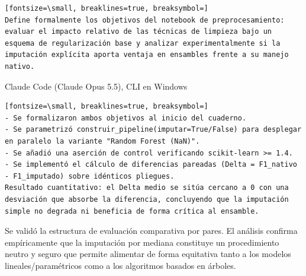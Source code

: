 \documentclass[12pt,a4paper,oneside]{book}
\begin{document}
\begin{iaprompt}
\begin{Verbatim}[fontsize=\small, breaklines=true, breaksymbol=]
Define formalmente los objetivos del notebook de preprocesamiento: evaluar el impacto relativo de las técnicas de limpieza bajo un esquema de regularización base y analizar experimentalmente si la imputación explícita aporta ventaja en ensambles frente a su manejo nativo.
\end{Verbatim}
\end{iaprompt}
\begin{iaresp}{Claude Code (Claude Opus 5.5), CLI en Windows}
\begin{Verbatim}[fontsize=\small, breaklines=true, breaksymbol=]
- Se formalizaron ambos objetivos al inicio del cuaderno.
- Se parametrizó construir_pipeline(imputar=True/False) para desplegar en paralelo la variante "Random Forest (NaN)".
- Se añadió una aserción de control verificando scikit-learn >= 1.4.
- Se implementó el cálculo de diferencias pareadas (Delta = F1_nativo - F1_imputado) sobre idénticos pliegues.
Resultado cuantitativo: el Delta medio se sitúa cercano a 0 con una desviación que absorbe la diferencia, concluyendo que la imputación simple no degrada ni beneficia de forma crítica al ensamble.
\end{Verbatim}
\end{iaresp}
\begin{iaanalisis}
Se validó la estructura de evaluación comparativa por pares. El análisis confirma empíricamente que la imputación por mediana constituye un procedimiento neutro y seguro que permite alimentar de forma equitativa tanto a los modelos lineales/paramétricos como a los algoritmos basados en árboles.
\end{iaanalisis}
\end{document}
